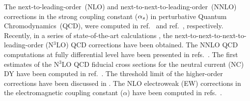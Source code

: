 \documentclass[a4paper]{jpconf}
\begin{document}
The next-to-leading-order~(NLO) and next-to-next-to-leading-order~(NNLO) corrections in the strong coupling constant ($\alpha_{s}$) 
in perturbative Quantum Chromodynamics~(QCD), were computed 
in ref.~\cite{Altarelli:1979ub} and ref.~\cite{Hamberg:1990np,Harlander:2002wh}, respectively.
% 
Recently, in a series of state-of-the-art calculations \cite{Duhr:2020seh,Duhr:2020sdp,Duhr:2021vwj},
the next-to-next-to-next-to-leading-order (N$^3$LO) QCD corrections have been obtained.
% 
The NNLO QCD computations at fully differential level have been presented in refs.~\cite{Anastasiou:2003yy,Anastasiou:2003ds,Melnikov:2006kv,Catani:2009sm,Catani:2010en}.
The first estimates of the N$^3$LO QCD fiducial cross sections for the neutral current (NC) DY have been computed in ref.~\cite{Camarda:2021ict}.
% 
% 
The threshold limit of the higher-order corrections have been discussed in \cite{Moch:2005ky,Ravindran:2005vv,Ravindran:2006cg,deFlorian:2012za,Ahmed:2014cla,Catani:2014uta,Li:2014afw,Ajjath:2020ulr}.
% 
The NLO electroweak (EW) corrections in the electromagnetic coupling constant ($\alpha$) have been computed 
in refs.~\cite{Dittmaier:2001ay,Baur:2001ze,Baur:2004ig,Arbuzov:2005dd,Zykunov:2005tc,Zykunov:2006yb,CarloniCalame:2006zq,CarloniCalame:2007cd,Arbuzov:2007db,Dittmaier:2009cr}.
\end{document}
